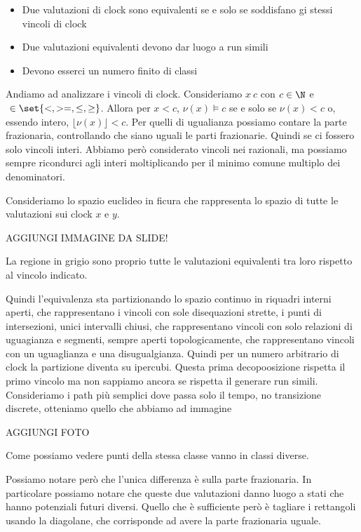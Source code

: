 \begin{itemize} 
  \item Due valutazioni di clock sono equivalenti se e solo se soddisfano gi stessi vincoli di clock
  \item Due valutazioni equivalenti devono dar luogo a run simili
  \item Devono esserci un numero finito di classi
\end{itemize}

Andiamo ad analizzare i vincoli di clock. Consideriamo \(x ~ c\) con \(c \in \N\) e \(~ \in \set{<,> =,\leq,\geq}\).
Allora per \(x<c\), \(\nu(x)\models c\) se e solo se \(\nu(x)< c\) o, essendo intero, \(\lfloor \nu(x) \rfloor < c\). Per quelli di ugualianza possiamo contare la parte frazionaria, controllando che siano uguali le parti frazionarie. Quindi se ci fossero solo vincoli interi. Abbiamo però considerato vincoli nei razionali, ma possiamo sempre ricondurci agli interi moltiplicando per il minimo comune multiplo dei denominatori. 

Consideriamo lo spazio euclideo in ficura che rappresenta lo spazio di tutte le valutazioni sui clock \(x\) e \(y\).

AGGIUNGI IMMAGINE DA SLIDE!

La regione in grigio sono proprio tutte le valutazioni equivalenti tra loro rispetto al vincolo indicato.

Quindi l'equivalenza sta partizionando lo spazio continuo in riquadri interni aperti, che rappresentano i vincoli con sole disequazioni strette, i punti di intersezioni, unici intervalli chiusi, che rappresentano vincoli con solo relazioni di uguagianza e segmenti, sempre aperti topologicamente, che rappresentano vincoli con un uguaglianza e una disugualgianza. Quindi per un numero arbitrario di clock la partizione diventa su ipercubi. Questa prima decopoosizione rispetta il primo vincolo ma non sappiamo ancora se rispetta il generare run simili. Consideriamo i path più semplici dove passa solo il tempo, no transizione discrete, otteniamo quello che abbiamo ad immagine

AGGIUNGI FOTO

Come possiamo vedere punti della stessa classe vanno in classi diverse.

Possiamo notare però che l'unica differenza è sulla parte frazionaria. In particolare possiamo notare che queste due valutazioni danno luogo a stati che hanno potenziali futuri diversi. Quello che è sufficiente però è tagliare i rettangoli usando la diagolane, che corrisponde ad avere la parte frazionaria uguale.

